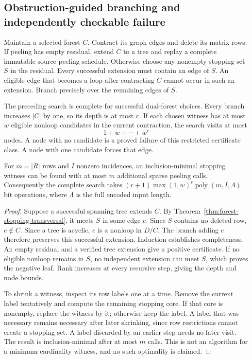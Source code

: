 \subsection{Obstruction-guided branching and independently checkable failure}

Maintain a selected forest $C$.  Contract its graph edges and delete its
matrix rows.  If peeling has empty residual, extend $C$ to a tree and
replay a complete immutable-source peeling schedule.  Otherwise choose
any nonempty stopping set $S$ in the residual.  Every successful extension
must contain an edge of $S$.  An eligible edge that becomes a loop after
contracting $C$ cannot occur in such an extension.  Branch precisely over
the remaining edges of $S$.

\begin{theorem}
\label{thm:forest-branching}
The preceding search is complete for successful dual-forest choices.
Every branch increases $|C|$ by one, so its depth is at most $r$.  If each
chosen witness has at most $w$ eligible nonloop candidates in the current
contraction, the search visits at most
\[
                 1+w+\cdots+w^r
\]
nodes.  A node with no candidate is a proved failure of this restricted
certificate class.  A node with one candidate forces that edge.

For $m=|R|$ rows and $I$ nonzero incidences, an inclusion-minimal stopping
witness can be found with at most $m$ additional sparse peeling calls.
Consequently the complete search takes
$(r+1)\max(1,w)^r\operatorname{poly}(m,I,\Lambda)$ bit operations,
where $\Lambda$ is the full encoded input length.
\end{theorem}
\begin{proof}
Suppose a successful spanning tree extends $C$.  By
Theorem~\ref{thm:forest-stopping-transversal}, it meets $S$ in some edge
$e$.  Since $S$ contains no deleted row, $e\notin C$.  Since a tree is
acyclic, $e$ is a nonloop in $D/C$.  The branch adding $e$ therefore
preserves this successful extension.  Induction establishes completeness.
An empty residual and a verified tree extension give a positive certificate.
If no eligible nonloop remains in $S$, no independent extension can meet
$S$, which proves the negative leaf.  Rank increases at every recursive
step, giving the depth and node bounds.

To shrink a witness, inspect its row labels one at a time.  Remove the
current label tentatively and compute the remaining stopping core.  If
that core is nonempty, replace the witness by it; otherwise keep the
label.  A label that was necessary remains necessary after later
shrinking, since row restrictions cannot create a stopping set.  A label
discarded by an earlier step needs no later visit.  The result is
inclusion-minimal after at most $m$ calls.  This is not an algorithm for
a minimum-cardinality witness, and no such optimality is claimed.
\end{proof}

